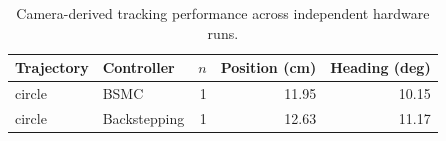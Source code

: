 \begin{table}[!t]
\centering
\caption{Camera-derived tracking performance across independent hardware runs.}
\label{tab:tracking}
\begin{tabular}{llrrr}
\hline
Trajectory & Controller & $n$ & Position (cm) & Heading (deg) \\
\hline
circle & BSMC & 1 & 11.95 & 10.15 \\
circle & Backstepping & 1 & 12.63 & 11.17 \\
\hline
\end{tabular}
\end{table}
